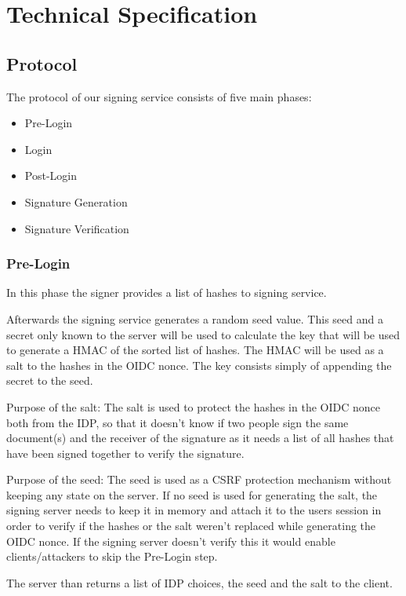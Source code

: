 \chapter{Technical Specification}
\section{Protocol}

The protocol of our signing service consists of five main phases:

\begin{itemize}
	\item Pre-Login
	\item Login
	\item Post-Login
	\item Signature Generation
	\item Signature Verification
\end{itemize}

\subsection{Pre-Login}
In this phase the signer provides a list of hashes to signing service. 

Afterwards the signing service generates a random seed value. This seed and a secret only known to the server will be used to calculate the key that will be used to generate a \gls{HMAC} of the sorted list of hashes. The \gls{HMAC} will be used as a salt to the hashes in the \gls{OIDC} nonce. The key consists simply of appending the secret to the seed.

Purpose of the salt:
The salt is used to protect the hashes in the \gls{OIDC} nonce both from the \gls{IDP}, so that it doesn't know if two people sign the same document(s) and the receiver of the signature as it needs a list of all hashes that have been signed together to verify the signature.

Purpose of the seed:
The seed is used as a \gls{CSRF} protection mechanism without keeping any state on the server.
If no seed is used for generating the salt, the signing server needs to keep it in memory and attach it to the users session in order to verify if the hashes or the salt weren't replaced while generating the \gls{OIDC} nonce.
If the signing server doesn't verify this it would enable clients/attackers to skip the Pre-Login step.

The server than returns a list of \gls{IDP} choices, the seed and the salt to the client.

